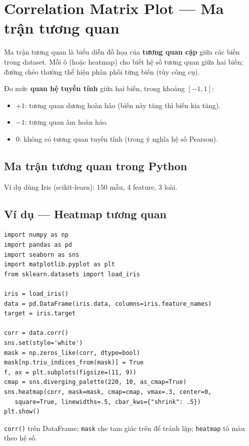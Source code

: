 \section{Correlation Matrix Plot --- Ma trận tương quan}
\label{sec:correlation-matrix}

\begin{dinhnghia}[title={Correlation matrix plot}]
Ma trận tương quan là biểu diễn đồ họa của \textbf{tương quan cặp} giữa các biến trong dataset.
Mỗi ô (hoặc heatmap) cho biết hệ số tương quan giữa hai biến; đường chéo thường thể hiện phân phối từng biến (tùy công cụ).
\end{dinhnghia}

\begin{ynghia}[title={Hệ số tương quan}]
Đo mức \textbf{quan hệ tuyến tính} giữa hai biến, trong khoảng $[-1, 1]$:
\begin{itemize}
  \item $+1$: tương quan dương hoàn hảo (biến này tăng thì biến kia tăng).
  \item $-1$: tương quan âm hoàn hảo.
  \item $0$: không có tương quan tuyến tính (trong ý nghĩa hệ số Pearson).
\end{itemize}
\end{ynghia}

\subsection{Ma trận tương quan trong Python}

\begin{phuongphap}[title={Dataset Iris}]
Ví dụ dùng Iris (scikit-learn): 150 mẫu, 4 feature, 3 loài.
\end{phuongphap}

\subsection{Ví dụ --- Heatmap tương quan}

\begin{vidu}[title={Code đầy đủ (Pandas + Seaborn)}]
\begin{lstlisting}
import numpy as np
import pandas as pd
import seaborn as sns
import matplotlib.pyplot as plt
from sklearn.datasets import load_iris

iris = load_iris()
data = pd.DataFrame(iris.data, columns=iris.feature_names)
target = iris.target

corr = data.corr()
sns.set(style='white')
mask = np.zeros_like(corr, dtype=bool)
mask[np.triu_indices_from(mask)] = True
f, ax = plt.subplots(figsize=(11, 9))
cmap = sns.diverging_palette(220, 10, as_cmap=True)
sns.heatmap(corr, mask=mask, cmap=cmap, vmax=.3, center=0,
   square=True, linewidths=.5, cbar_kws={"shrink": .5})
plt.show()
\end{lstlisting}

\texttt{corr()} trên DataFrame; \texttt{mask} che tam giác trên để tránh lặp; \texttt{heatmap} tô màu theo hệ số.
\end{vidu}

